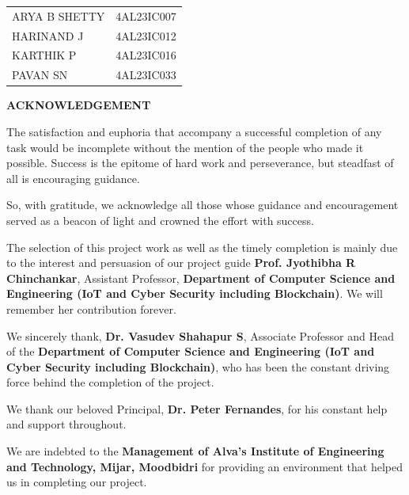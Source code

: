 \documentclass[12pt,a4paper]{report}
\begin{document}
\vspace{2cm}
\begin{center}
\begin{tabular}{l r}
ARYA B SHETTY & 4AL23IC007 \\
HARINAND J & 4AL23IC012 \\
KARTHIK P & 4AL23IC016 \\
PAVAN SN & 4AL23IC033 \\
\end{tabular}
\end{center}
\newpage

\thispagestyle{empty}
\begin{center}
\textbf{\Large ACKNOWLEDGEMENT}\\[0.5cm]
\end{center}

The satisfaction and euphoria that accompany a successful completion of any task would be incomplete without the mention of the people who made it possible. Success is the epitome of hard work and perseverance, but steadfast of all is encouraging guidance.

\vspace{0.5cm}
So, with gratitude, we acknowledge all those whose guidance and encouragement served as a beacon of light and crowned the effort with success.

\vspace{0.5cm}
The selection of this project work as well as the timely completion is mainly due to the interest and persuasion of our project guide \textbf{Prof. Jyothibha R Chinchankar}, Assistant Professor, \textbf{Department of Computer Science and Engineering (IoT and Cyber Security including Blockchain)}. We will remember her contribution forever.

\vspace{0.5cm}
We sincerely thank, \textbf{Dr. Vasudev Shahapur S}, Associate Professor and Head of the \textbf{Department of Computer Science and Engineering (IoT and Cyber Security including Blockchain)}, who has been the constant driving force behind the completion of the project.

\vspace{0.5cm}
We thank our beloved Principal, \textbf{Dr. Peter Fernandes}, for his constant help and support throughout.

\vspace{0.5cm}
We are indebted to the \textbf{Management of Alva's Institute of Engineering and Technology, Mijar, Moodbidri} for providing an environment that helped us in completing our project.
\end{document}
